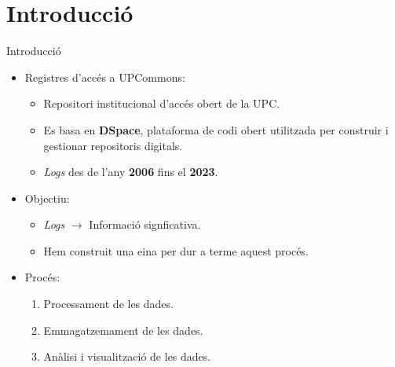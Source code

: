 \section{Introducció}\label{sec:introduction}

\begin{frame}{Introducció}
    \begin{itemize}%
        \item Registres d'accés a UPCommons:
        \begin{itemize}%
            \item Repositori institucional d’accés obert de la UPC.
            \item Es basa en \textbf{DSpace}, plataforma de codi obert utilitzada per construir i gestionar repositoris digitals.
            \item \textit{Logs} des de l'any \textbf{2006} fins el \textbf{2023}.
        \end{itemize}
        \item Objectiu:
        \begin{itemize}
            \item \textit{Logs} \(\rightarrow\) Informació signficativa.
            \item Hem construit una eina per dur a terme aquest procés.
        \end{itemize}
        \item Procés:
        \begin{enumerate}
            \item Processament de les dades.
            \item Emmagatzemament de les dades.
            \item Anàlisi i visualització de les dades.
        \end{enumerate}
    \end{itemize}
\end{frame}